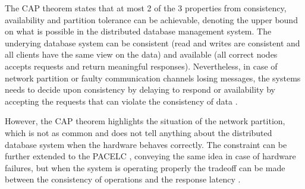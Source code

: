 The CAP theorem \cite{CAPTheorem} states that at most 2 of the 3 properties from consistency, availability and partition tolerance can be achievable, denoting the upper bound on what is possible in the distributed database management system. The underying database system can be consistent (read and writes are consistent and all clients have the same view on the data) and available (all correct nodes accepts requests and return meaningful responses). Nevertheless, in case of network partition or faulty communication channels losing messages, the systems needs to decide upon consistency by delaying to respond or availability by accepting the requests that can violate the consistency of data \cite{PerspectivesOnArchitectureEvolution}.

However, the CAP theorem highlights the situation of the network partition, which is not as common and does not tell anything about the distributed database system when the hardware behaves correctly. The constraint can be further extended to the PACELC \cite{PACELC}, conveying the same idea in case of hardware failures, but when the system is operating properly the tradeoff can be made between the consistency of operations and the response latency \cite{NoSQLDatabaseSystemsSurveyDecisionGuidance}.




